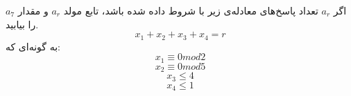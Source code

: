     \p 
اگر 
$a_r$
تعداد پاسخ‌های معادله‌ی زیر با شروط داده شده باشد، تابع مولد
$a_r$
و مقدار
$a_7$
را بیابید.
$$x_1 + x_2 + x_3 + x_4 = r$$
به گونه‌ای که:
$$x_1 \equiv 0 mod 2$$
$$x_2 \equiv 0 mod 5$$
$$x_3 \leq 4$$
$$x_4 \leq 1$$